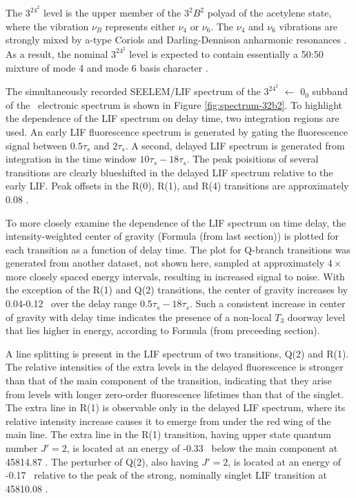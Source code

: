 \documentclass[12pt]{mitthesis}
\begin{document}
The $3^24^2$ level is the upper member of the $3^2B^2$ polyad of the
acetylene \astate state, where the vibration $\nu_B$ represents either
$\nu_4$ or $\nu_6$.  The $\nu_4$ and $\nu_6$ vibrations are strongly
mixed by a-type Coriols and Darling-Dennison anharmonic resonances
\cite{merer08}.  As a result, the nominal $3^24^2$ level is expected
to contain essentially a 50:50 mixture of mode 4 and mode 6 basis
character \cite{merer08, virgo07}.

The simultaneously recorded SEELEM/LIF spectrum of the $3^24^2$ 
$\leftarrow$ $0_0$ subband of the \AtoX\ electronic spectrum is shown
in Figure \ref{fig:spectrum-32b2}. To highlight the dependence of the
LIF spectrum on delay time, two integration regions are used.  An
early LIF fluorescence spectrum is generated by gating the
fluorescence signal between $0.5\tau_s$ and $2\tau_s$.  A second,
delayed LIF spectrum is generated from integration in the time window
$10\tau_s-18\tau_s$.  The peak poisitions of several transitions are
clearly blueshifted in the delayed LIF spectrum relative to the early
LIF.  Peak offsets in the R(0), R(1), and R(4) transitions are
approximately 0.08 \rcm.

To more closely examine the dependence of the LIF spectrum on time
delay, the intensity-weighted center of gravity (Formula (from last
section)) is plotted for each transition as a function of delay time.
The plot for Q-branch transitions was generated from another dataset,
not shown here, sampled at approximately $4 \times$ more closely
spaced energy intervals, resulting in increased signal to noise.  With
the exception of the R(1) and Q(2) transitions, the center of gravity
increases by 0.04-0.12 \rcm\ over the delay range
$0.5\tau_s-18\tau_s$.  Such a consistent increase in center of gravity
with delay time indicates the presence of a non-local $T_3$ doorway
level that lies higher in energy, according to Formula (from
preceeding section).


A line splitting is present in the LIF spectrum of two transitions,
Q(2) and R(1).  The relative intensities of the extra levels in the
delayed fluorescence is stronger than that of the main component of
the transition, indicating that they arise from levels with longer
zero-order fluorescence lifetimes than that of the singlet.  The extra
line in R(1) is observable only in the delayed LIF spectrum, where its
relative intensity increase causes it to emerge from under the red
wing of the main line.  The extra line in the R(1) transition, having
upper state quantum number $J'=2$, is located at an energy of -0.33
\rcm\ below the main component at 45814.87 \rcm.  The perturber of
Q(2), also having $J'=2$, is located at an energy of -0.17 \rcm\
relative to the peak of the strong, nominally singlet LIF transition
at 45810.08 \rcm.
\end{document}
